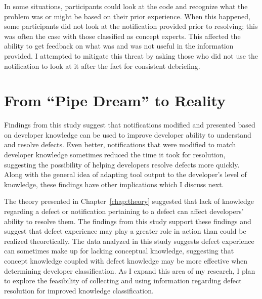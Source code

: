 In some situations, participants could look at the code and recognize what the problem was or might be based on their prior experience. When this happened, some participants did not look at the notification provided prior to resolving; this was often the case with those classified as concept experts. This affected the ability to get feedback on what was and was not useful in the information provided. I attempted to mitigate this threat by asking those who did not use the notification to look at it after the fact for consistent debriefing.


\section{From ``Pipe Dream'' to Reality}
Findings from this study suggest that notifications modified and presented based on developer knowledge can be used to improve developer ability to understand and resolve defects. 
Even better, notifications that were modified to match developer knowledge sometimes reduced the time it took for resolution, suggesting the possibility of helping developers resolve defects more quickly.
Along with the general idea of adapting tool output to the developer's level of knowledge, these findings have other implications which I discuss next.

The theory presented in Chapter~\ref{chap:theory} suggested that lack of knowledge regarding a defect or notification pertaining to a defect can affect developers' ability to resolve them. The findings from this study support these findings and suggest that defect experience may play a greater role in action than could be realized theoretically. The data analyzed in this study suggests defect experience can sometimes make up for lacking conceptual knowledge, suggesting that concept knowledge coupled with defect knowledge may be more effective when determining developer classification. As I expand this area of my research, I plan to explore the feasibility of collecting and using information regarding defect resolution for improved knowledge classification.



